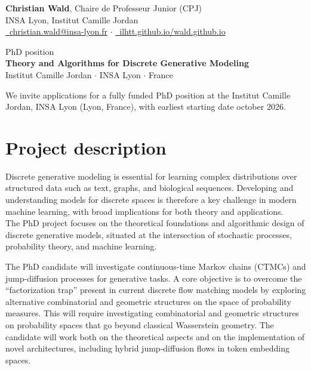 \documentclass[11pt, a4paper]{article}
\begin{document}
\thispagestyle{empty}

\begin{flushright}
\sffamily
\textbf{Christian Wald}, Chaire de Professeur Junior (CPJ) \\
INSA Lyon, Institut Camille Jordan \\
\href{mailto:christian.wald@insa-lyon.fr}{\faEnvelope\ christian.wald@insa-lyon.fr} \quad $\cdot$ \quad \href{https://ilhtt.github.io/wald.github.io/}{\faGlobe\ ilhtt.github.io/wald.github.io}
\end{flushright}
\vspace{1em}

{\sffamily
\Large PhD position \\[0.5em]
\huge \textbf{Theory and Algorithms for Discrete Generative Modeling} \\[0.5em]
\Large \faMapMarker* Institut Camille Jordan $\cdot$ INSA Lyon $\cdot$ France
}
\vspace{1.5em}

We invite applications for a fully funded PhD position at the Institut Camille Jordan, INSA Lyon (Lyon, France), with earliest starting date october 2026.

\section*{Project description}
Discrete generative modeling is essential for learning complex distributions over structured data such as text, graphs, and biological sequences. Developing and understanding models for discrete spaces is therefore a key challenge in modern machine learning, with broad implications for both theory and applications.\\
The PhD project focuses on the theoretical foundations and algorithmic design of discrete generative models, situated at the intersection of stochastic processes, probability theory, and machine learning.

The PhD candidate will investigate continuous-time Markov chains (CTMCs) and jump-diffusion processes for generative tasks. A core objective is to overcome the ``factorization trap'' present in current discrete flow matching models by exploring alternative combinatorial and geometric structures on the space of probability measures. This will require investigating combinatorial and geometric structures on probability spaces that go beyond classical Wasserstein geometry. The candidate will work both on the theoretical aspects and on the implementation of novel architectures, including hybrid jump-diffusion flows in token embedding spaces.
\end{document}
